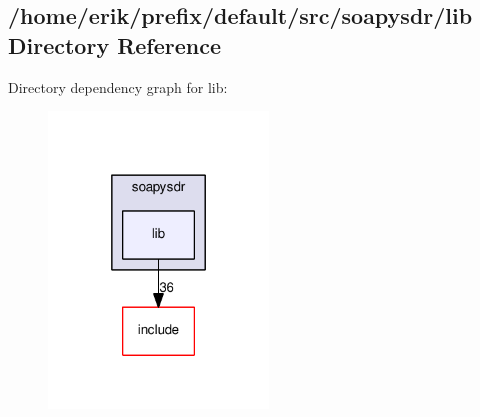 \subsection{/home/erik/prefix/default/src/soapysdr/lib Directory Reference}
\label{dir_d61073c2949e064096365076d71e4557}
Directory dependency graph for lib\+:
\nopagebreak
\begin{figure}[H]
\begin{center}
\leavevmode
\includegraphics[width=166pt]{dir_d61073c2949e064096365076d71e4557_dep}
\end{center}
\end{figure}
